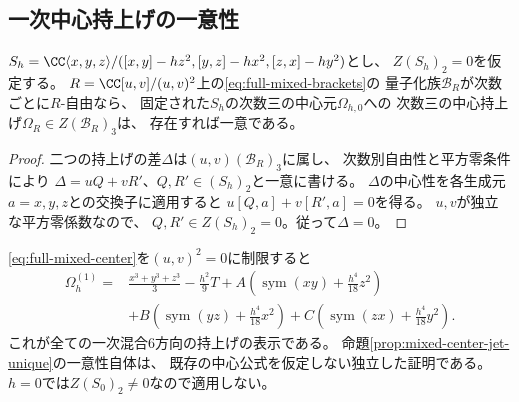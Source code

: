 \subsection{一次中心持上げの一意性}
\begin{proposition}\label{prop:mixed-center-jet-unique}
$S_h=\CC\langle x,y,z\rangle/
([x,y]-hz^2,[y,z]-hx^2,[z,x]-hy^2)$とし、
$Z(S_h)_2=0$を仮定する。
$R=\CC[u,v]/(u,v)^2$上の\eqref{eq:full-mixed-brackets}の
量子化族$\mathcal B_R$が次数ごとに$R$-自由なら、
固定された$S_h$の次数三の中心元$\Omega_{h,0}$への
次数三の中心持上げ$\Omega_R\in Z(\mathcal B_R)_3$は、
存在すれば一意である。
\end{proposition}
\begin{proof}
二つの持上げの差$\Delta$は$(u,v)(\mathcal B_R)_3$に属し、
次数別自由性と平方零条件により
$\Delta=uQ+vR'$、$Q,R'\in(S_h)_2$と一意に書ける。
$\Delta$の中心性を各生成元$a=x,y,z$との交換子に適用すると
$u[Q,a]+v[R',a]=0$を得る。
$u,v$が独立な平方零係数なので、
$Q,R'\in Z(S_h)_2=0$。従って$\Delta=0$。
\end{proof}
\begin{remark}
\eqref{eq:full-mixed-center}を$(u,v)^2=0$に制限すると
\[
\begin{aligned}
 \Omega_h^{(1)}
 ={}&\frac{x^3+y^3+z^3}{3}-\frac{h^2}{9}T
 +A\left(\operatorname{sym}(xy)+\frac{h^4}{18}z^2\right)\\
 &+B\left(\operatorname{sym}(yz)+\frac{h^4}{18}x^2\right)
 +C\left(\operatorname{sym}(zx)+\frac{h^4}{18}y^2\right).
\end{aligned}
\]
これが全ての一次混合6方向の持上げの表示である。
命題\ref{prop:mixed-center-jet-unique}の一意性自体は、
既存の中心公式を仮定しない独立した証明である。
$h=0$では$Z(S_0)_2\ne0$なので適用しない。
\end{remark}

